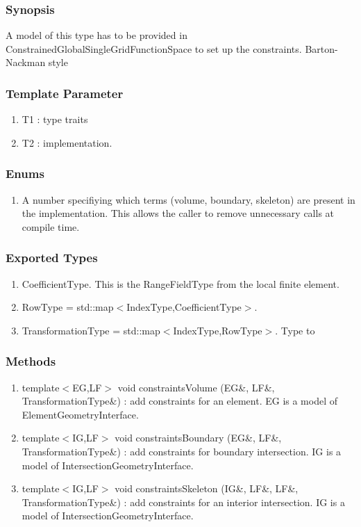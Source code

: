\documentclass[11pt,a4paper,DIV11,%
notitlepage,oneside,abstracton,%
bibtotoc]{scrartcl}
\begin{document}
\subsubsection{Synopsis}

A model of this type has to be provided in
ConstrainedGlobalSingleGridFunctionSpace to set up the constraints.
Barton-Nackman style 

\subsubsection{Template Parameter}

\begin{enumerate}[1)]
\item T1 : type traits
\item T2 : implementation.
\end{enumerate}

\subsubsection{Enums}

\begin{enumerate}[1)]
\item A number specifiying which terms (volume, boundary, skeleton)
  are present in the implementation. This allows the caller to remove
  unnecessary calls at compile time.
\end{enumerate}

\subsubsection{Exported Types}

\begin{enumerate}[1)]
\item CoefficientType. This is the RangeFieldType from the local finite element.
\item RowType = std::map$<$IndexType,CoefficientType$>$.
\item TransformationType = std::map$<$IndexType,RowType$>$. Type to
\end{enumerate}

\subsubsection{Methods}

\begin{enumerate}[1)]
\item template$<$EG,LF$>$ void constraintsVolume (EG\&,
  LF\&, TransformationType\&) : add constraints for an element. EG is
  a model of ElementGeometryInterface.
\item template$<$IG,LF$>$ void constraintsBoundary (EG\&,
  LF\&, TransformationType\&) : add constraints for boundary
  intersection. IG is a model of IntersectionGeometryInterface.
\item template$<$IG,LF$>$ void constraintsSkeleton (IG\&,
  LF\&, LF\&, TransformationType\&) : add constraints for an
  interior intersection. IG is a model of IntersectionGeometryInterface.
\end{enumerate}
\end{document}
